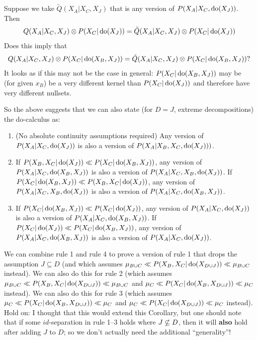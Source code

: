 {\begin{enumerate}
Suppose we take $\tilde Q(X_A|X_C,X_J)$ that is any version of $P(X_A|X_C,\operatorname{do}(X_J))$.
Then 
$$Q(X_A|X_C,X_J) \otimes P(X_C|\operatorname{do}(X_J)) = \tilde Q(X_A|X_C,X_J) \otimes P(X_C|\operatorname{do}(X_J))$$
Does this imply that
$$Q(X_A|X_C,X_J) \otimes P(X_C|\operatorname{do}(X_B,X_J)) = \tilde Q(X_A|X_C,X_J) \otimes P(X_C|\operatorname{do}(X_B,X_J))?$$
It looks as if this may not be the case in general:
$P(X_C|\operatorname{do}(X_B,X_J))$ may be (for given $x_B$) be a very different kernel than $P(X_C|\operatorname{do}(X_J))$
and therefore have very different nullsets.
\end{enumerate}
So the above suggests that we can also state (for $D=J$, extreme decompositions) the do-calculus as:
\begin{enumerate}
  \item (No absolute continuity assumptions required) Any version of $P(X_A|X_C,\operatorname{do}(X_J))$ is also a version of $P(X_A|X_B,X_C,\operatorname{do}(X_J)))$.
  \item If $P(X_B,X_C|\operatorname{do}(X_J)) \ll P(X_C|\operatorname{do}(X_B,X_J))$, any version of $P(X_A|X_C,\operatorname{do}(X_B,X_J))$ is also a version of $P(X_A|X_C,X_B,\operatorname{do}(X_J))$.
        If $P(X_C|\operatorname{do}(X_B,X_J)) \ll P(X_B,X_C|\operatorname{do}(X_J))$, any version of $P(X_A|X_C,X_B,\operatorname{do}(X_J))$ is also a version of $P(X_A|X_C,\operatorname{do}(X_B,X_J))$.
  \item If $P(X_C|\operatorname{do}(X_B,X_J)) \ll P(X_C|\operatorname{do}(X_J))$, any version of $P(X_A|X_C,\operatorname{do}(X_J))$ is also a version of $P(X_A|X_C,\operatorname{do}(X_B,X_J))$.
    If $P(X_C|\operatorname{do}(X_J)) \ll P(X_C|\operatorname{do}(X_B,X_J))$, any version of $P(X_A|X_C,\operatorname{do}(X_B,X_J))$ is also a version of $P(X_A|X_C,\operatorname{do}(X_J))$.
\end{enumerate}
}


\begin{Rem}
We can combine rule 1 and rule 4 to prove a version of rule 1 that drops the assumption $J \subseteq D$ (and which assumes $\mu_{B \cup C} \ll P(X_B,X_C|\operatorname{do}(X_{D\cup J}))\ll \mu_{B \cup C}$ instead).
We can also do this for rule 2 (which assumes $\mu_{B \cup C} \ll  P(X_B,X_C|\operatorname{do}(X_{D\cup J})) \ll \mu_{B \cup C}$ and $\mu_C \ll  P(X_C|\operatorname{do}(X_B,X_{D\cup J})) \ll \mu_C$ instead).
We can also do this for rule 3 (which assumes $\mu_C \ll P(X_C|\operatorname{do}(X_B,X_{D\cup J})) \ll \mu_C$ and $\mu_C \ll P(X_C|\operatorname{do}(X_{D \cup J})) \ll \mu_C$ instead).
Hold on: I thought that this would extend this Corollary, but one should note that if some $id$-separation in rule 1--3 holds where $J \not\subseteq D$, then it will \textbf{also} hold after adding $J$ to $D$; so we don't actually need the additional ``generality''!
\end{Rem}

